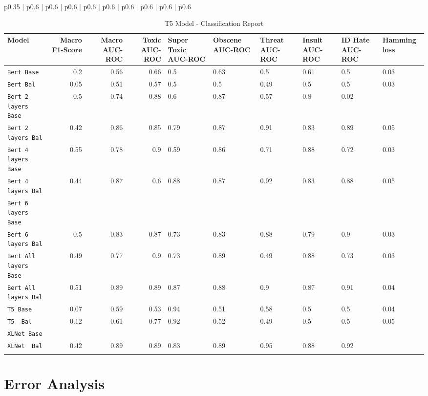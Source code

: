 \documentclass[11pt,a4paper]{article}
\begin{document}
\begin{table} {p{0.35\linewidth} | p{0.6\linewidth} | p{0.6\linewidth} | p{0.6\linewidth} | p{0.6\linewidth} | p{0.6\linewidth} | p{0.6\linewidth} | p{0.6\linewidth} | p{0.6\linewidth} | p{0.6\linewidth}}
\centering
\begin{tabular}{lrrr}
\hline
\textbf{Model} & \textbf{Macro F1-Score} & \textbf{Macro AUC-ROC} & \textbf{Toxic AUC-ROC}  & \textbf{Super Toxic AUC-ROC} & \textbf{Obscene AUC-ROC} & \textbf{Threat AUC-ROC} & \textbf{Insult AUC-ROC} & \textbf{ID Hate AUC-ROC} & \textbf{Hamming loss}\\
\hline
\verb|Bert Base| & 0.2 & 0.56 & 0.66 & 0.5 & 0.63 & 0.5 & 0.61 & 0.5 & 0.03 \\
\verb|Bert Bal| & 0.05 & 0.51 & 0.57 & 0.5 & 0.5 & 0.49 & 0.5 & 0.5 & 0.03 \\
\verb|Bert 2 layers Base| & 0.5 & 0.74 & 0.88 & 0.6 & 0.87 & 0.57 & 0.8 & 0.02 \\
\verb|Bert 2 layers Bal| & 0.42 & 0.86 & 0.85 & 0.79 & 0.87 & 0.91 & 0.83 & 0.89 & 0.05 \\
\verb|Bert 4 layers Base| & 0.55 & 0.78 & 0.9 & 0.59 & 0.86 & 0.71 & 0.88 & 0.72 & 0.03 \\
\verb|Bert 4 layers Bal| & 0.44 & 0.87 & 0.6 & 0.88 & 0.87 & 0.92 & 0.83 & 0.88 & 0.05 \\
\verb|Bert 6 layers Base| & & & & & & & & & \\
\verb|Bert 6 layers Bal| & 0.5 & 0.83 & 0.87 & 0.73 & 0.83 & 0.88 & 0.79 & 0.9 & 0.03 \\
\verb|Bert All layers Base| & 0.49 & 0.77 & 0.9 & 0.73 & 0.89 & 0.49 & 0.88 & 0.73 & 0.03 \\
\verb|Bert All layers Bal| & 0.51 & 0.89 & 0.89 & 0.87 & 0.88 & 0.9 & 0.87 & 0.91 & 0.04 \\
\verb|T5 Base| & 0.07 & 0.59 & 0.53 & 0.94 & 0.51 & 0.58 & 0.5 & 0.5 & 0.04 \\
\verb|T5  Bal| & 0.12 & 0.61 & 0.77 & 0.92 & 0.52 & 0.49 & 0.5 & 0.5 & 0.05 \\
\verb|XLNet Base| & & & & & & & & & \\
\verb|XLNet  Bal| & 0.42 & 0.89 & 0.89 & 0.83 & 0.89 & 0.95 & 0.88 & 0.92 & \\
\vspace{2\baselineskip}\\
\hline
\end{tabular}
\caption{T5  Model - Classification Report}
\label{table:results}
\end{table}
\section{Error Analysis}
\end{document}
